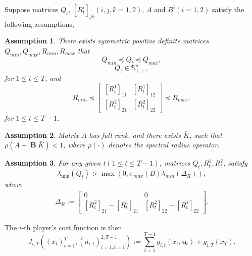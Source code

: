 \documentclass[letterpaper, 10 pt, conference]{ieeeconf}  %
\DeclareMathOperator{\contB}{\mathbf{B}}
\newtheorem{assumption}{Assumption}
\begin{document}
Suppose matrices $Q_{t}$, $[R_{t}^{i}]_{jk}(i,j,k = 1,2)$, $A$ and $B^{i}(i=1,2)$ satisfy the following assumptions,
\begin{assumption}\label{assumption:bounds}
    There exists symmetric positive definite matrices $Q_{min}, Q_{max}, R_{min}, R_{max}$ that
    \begin{equation}
        Q_{min} \preceq Q_{t} \preceq Q_{max},
    \end{equation}
    \begin{equation}
        Q_{t} \in \mathbb{S}^{n}_{++},
    \end{equation}
    for $1\leq t \leq T$, and
    \begin{equation}\label{eq:positiveR}
        R_{min} \preceq 
        \begin{bmatrix}
            [R_{t}^{1}]_{11} & [R_{t}^{1}]_{12}\\
            [R_{t}^{2}]_{21} & [R_{t}^{2}]_{22}
        \end{bmatrix}
        \preceq R_{max},
    \end{equation}
    for $1 \leq t \leq T-1$.
\end{assumption}
\begin{assumption}\label{assumption:controllable}
    Matrix $A$ has full rank, and there exists $\bar{K}$, such that $\rho(A + \contB \bar{K}) < 1$, where $\rho(\cdot)$ denotes the spectral radius operator.
\end{assumption}
\begin{assumption}\label{assumption:lowerQ}
    For any given $t(1\leq t \leq T-1)$, matrices $Q_{t}, R_{t}^{1}, R_{t}^{2}$,
    satisfy
    \begin{equation}
        \lambda_{\min}(Q_{t}) > \max(0,\sigma_{max}(B)\lambda_{min}(\Delta_{R})),
    \end{equation}
    where
    \begin{align*}
        \Delta_{R} := \begin{bmatrix}
            0 & 0\\
            [R_{t}^{2}]_{21} - [R_{t}^{1}]_{21} & [R_{t}^{2}]_{22} - [R_{t}^{1}]_{22}
        \end{bmatrix}.
    \end{align*}
\end{assumption}
The $i$-th player's cost function is then
\begin{equation}\label{eq:LQcost}
    J_{i,T}((x_{t})_{t=1}^{T},(u_{i,t})_{i=1,t=1}^{2,T-1}) := \sum_{t=1}^{T-1} g_{i,t}(x_{t}, \mathbf{u}_{t}) + g_{i,T}(x_{T}).
\end{equation}
\end{document}
